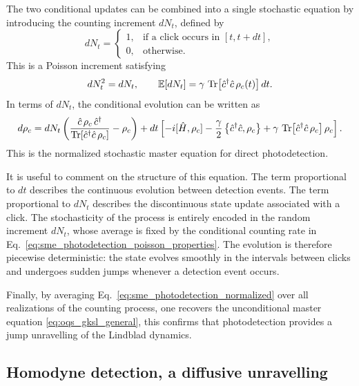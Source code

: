 The two conditional updates can be combined into a single stochastic equation by introducing the counting increment \(dN_t\), defined by
\begin{equation}
	dN_t=
	\begin{cases}
		1, & \text{if a click occurs in } [t,t+dt],\\
		0, & \text{otherwise}.
	\end{cases}
	\label{eq:sme_photodetection_counting_increment_definition}
\end{equation}
This is a Poisson increment satisfying
\begin{equation}
	dN_t^2=dN_t,
	\qquad
	\mathbb{E}[dN_t]
	=
	\gamma\,\Tr\!\left[\hat c^\dagger \hat c\,\rho_c(t)\right]dt.
	\label{eq:sme_photodetection_poisson_properties}
\end{equation}
In terms of \(dN_t\), the conditional evolution can be written as
\begin{equation}
	d\rho_c
	=
	dN_t
	\left(
	\frac{\hat c\,\rho_c\,\hat c^\dagger}
	{\Tr\!\left[\hat c^\dagger \hat c\,\rho_c\right]}
	-
	\rho_c
	\right)
	+
	dt
	\left[
	-i[\hat H,\rho_c]
	-\frac{\gamma}{2}
	\left\{
	\hat c^\dagger \hat c,\rho_c
	\right\}
	+
	\gamma\,\Tr\!\left[\hat c^\dagger \hat c\,\rho_c\right]\rho_c
	\right].
	\label{eq:sme_photodetection_normalized}
\end{equation}
This is the normalized stochastic master equation for direct photodetection.

It is useful to comment on the structure of this equation. The term proportional to \(dt\) describes the continuous evolution between detection events. The term proportional to \(dN_t\) describes the discontinuous state update associated with a click. The stochasticity of the process is entirely encoded in the random increment \(dN_t\), whose average is fixed by the conditional counting rate in Eq.~\eqref{eq:sme_photodetection_poisson_properties}. The evolution is therefore piecewise deterministic: the state evolves smoothly in the intervals between clicks and undergoes sudden jumps whenever a detection event occurs.

Finally, by averaging Eq.~\eqref{eq:sme_photodetection_normalized} over all realizations of the counting process, one recovers the unconditional master equation \eqref{eq:oqs_gksl_general}, this confirms that photodetection provides a jump unravelling of the Lindblad dynamics.
 
\subsection{Homodyne detection, a diffusive unravelling}
\label{subsec:homodyne_diffusive_unravelling}

